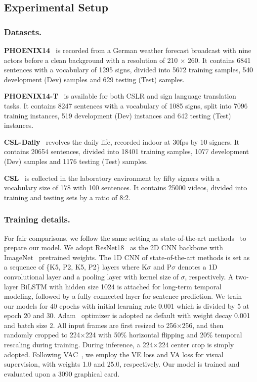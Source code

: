 \documentclass[10pt,twocolumn,letterpaper]{article}
\begin{document}
\subsection{Experimental Setup}
\subsubsection{Datasets.} \textbf{PHOENIX14}~\cite{koller2015continuous} is recorded from a German weather forecast broadcast with nine actors before a clean background with a resolution of 210 $\times$ 260. It contains 6841 sentences with a vocabulary of 1295 signs, divided into 5672 training samples, 540 development (Dev) samples and 629 testing (Test) samples.

\textbf{PHOENIX14-T}~\cite{camgoz2018neural} is available for both CSLR and sign language translation tasks. It contains 8247 sentences with a vocabulary of 1085 signs, split into 7096 training instances, 519 development (Dev) instances and 642 testing (Test) instances.

\textbf{CSL-Daily}~\cite{zhou2021improving} revolves the daily life, recorded indoor at 30fps by 10 signers. It contains 20654 sentences, divided into 18401 training samples, 1077 development (Dev) samples and 1176 testing (Test) samples. 

\textbf{CSL}~\cite{huang2018video} is collected in the laboratory environment by fifty signers with a vocabulary size of 178 with 100 sentences. It contains 25000 videos, divided into training and testing sets by a ratio of 8:2.

\subsubsection{Training details.} For fair comparisons, we follow the same setting as state-of-the-art methods~\cite{Min_2021_ICCV,zuo2022c2slr} to prepare our model. We adopt ResNet18~\cite{he2016deep} as the 2D CNN backbone with ImageNet~\cite{deng2009imagenet} pretrained weights. The 1D CNN of state-of-the-art methods is set as a sequence of \{K5, P2, K5, P2\} layers where K$\sigma$ and P$\sigma$ denotes a 1D convolutional layer and a pooling layer with kernel size of $\sigma$, respectively. A two-layer BiLSTM with hidden size 1024 is attached for long-term temporal modeling, followed by a fully connected layer for sentence prediction. We train our models for 40 epochs with initial learning rate 0.001 which is divided by 5 at epoch 20 and 30. Adam~\cite{kingma2014adam} optimizer is adopted as default with weight decay 0.001 and batch size 2. All input frames are first resized to 256$\times$256, and then randomly cropped to 224$\times$224 with 50\% horizontal flipping and 20\% temporal rescaling during training. During inference, a 224$\times$224 center crop is simply adopted. Following VAC~\cite{Min_2021_ICCV}, we employ the VE loss and VA loss for visual supervision, with weights 1.0 and 25.0, respectively. Our model is trained and evaluated upon a 3090 graphical card.
\end{document}
